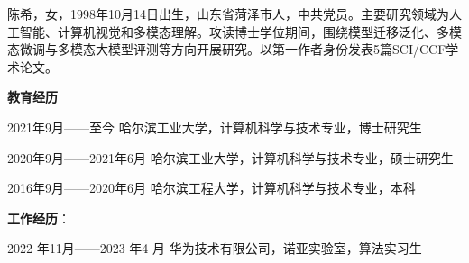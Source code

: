 
\begin{resume}
    陈希，女，1998年10月14日出生，山东省菏泽市人，中共党员。主要研究领域为人工智能、计算机视觉和多模态理解。攻读博士学位期间，围绕模型迁移泛化、多模态微调与多模态大模型评测等方向开展研究。以第一作者身份发表5篇SCI/CCF学术论文。

\noindent\textbf{教育经历}

    2021年9月------至今 \qquad      哈尔滨工业大学，计算机科学与技术专业，博士研究生

    2020年9月------2021年6月     \qquad  哈尔滨工业大学，计算机科学与技术专业，硕士研究生

    2016年9月------2020年6月   \qquad   哈尔滨工程大学，计算机科学与技术专业，本科

\noindent\textbf{工作经历}：

2022 年11月------2023 年4 月 \qquad 华为技术有限公司，诺亚实验室，算法实习生
    
\end{resume}